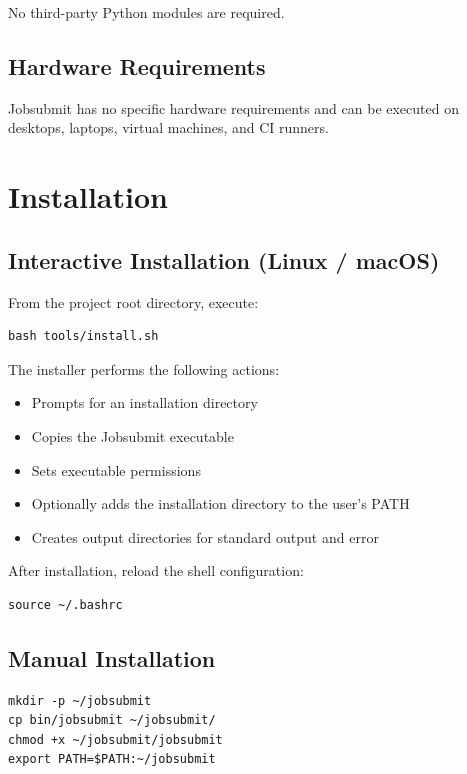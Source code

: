 \documentclass[12pt,a4paper]{article}
\begin{document}
No third-party Python modules are required.

\subsection{Hardware Requirements}
Jobsubmit has no specific hardware requirements and can be executed on desktops, laptops, virtual machines, and CI runners.

\section{Installation}

\subsection{Interactive Installation (Linux / macOS)}

From the project root directory, execute:

\begin{lstlisting}
bash tools/install.sh
\end{lstlisting}

The installer performs the following actions:

\begin{itemize}
    \item Prompts for an installation directory
    \item Copies the Jobsubmit executable
    \item Sets executable permissions
    \item Optionally adds the installation directory to the user's PATH
    \item Creates output directories for standard output and error
\end{itemize}

After installation, reload the shell configuration:

\begin{lstlisting}
source ~/.bashrc
\end{lstlisting}

\subsection{Manual Installation}

\begin{lstlisting}
mkdir -p ~/jobsubmit
cp bin/jobsubmit ~/jobsubmit/
chmod +x ~/jobsubmit/jobsubmit
export PATH=$PATH:~/jobsubmit
\end{lstlisting}
\end{document}
